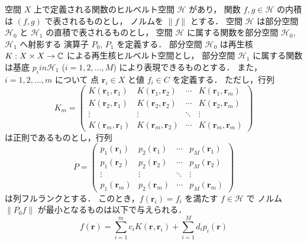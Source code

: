 \begin{theorem}\label{theorem:interp_kernel_rkhs_exact-interp-with-additional-terms}
    空間 $X$ 上で定義される関数のヒルベルト空間 $\mathcal{H}$ があり，
    関数 $f, g \in \mathcal{H}$ の内積は $(f, g)$ で表されるものとし，
    ノルムを $\|f\|$ とする．
    空間 $\mathcal{H}$ は部分空間 $\mathcal{H}_0$ と $\mathcal{H}_1$ の直積で表されるものとし，
    空間 $\mathcal{H}$ に属する関数を部分空間 $\mathcal{H}_0$, $\mathcal{H}_1$ へ射影する
    演算子 $P_0$, $P_1$ を定義する．
    部分空間 $\mathcal{H}_0$ は再生核 $K : X \times X \to \mathbb{C}$ による再生核ヒルベルト空間とし，
    部分空間 $\mathcal{H}_1$ に属する関数は基底 $p_i in \mathcal{H}_1$ ($i = 1, 2, \ldots, M$)
    により表現できるものとする．
    また，$i = 1, 2, \ldots, m$ について
    点 $\bm{r}_i \in X$ と値 $f_i \in C$ を定義する．
    ただし，行列
    \begin{equation}
        K_m =
        \begin{pmatrix}
            K(\bm{r}_1, \bm{r}_1) & K(\bm{r}_1, \bm{r}_2) & \cdots & K(\bm{r}_1, \bm{r}_m) \\
            K(\bm{r}_2, \bm{r}_1) & K(\bm{r}_2, \bm{r}_2) & \cdots & K(\bm{r}_2, \bm{r}_m) \\
            \vdots                & \vdots                & \ddots & \vdots                \\
            K(\bm{r}_m, \bm{r}_1) & K(\bm{r}_m, \bm{r}_2) & \cdots & K(\bm{r}_m, \bm{r}_m)
        \end{pmatrix}
    \end{equation}
    は正則であるものとし，行列
    \begin{equation}
        P =
        \begin{pmatrix}
            p_1(\bm{r}_1) & p_2(\bm{r}_1) & \cdots & p_M(\bm{r}_1) \\
            p_1(\bm{r}_2) & p_2(\bm{r}_2) & \cdots & p_M(\bm{r}_2) \\
            \vdots        & \vdots        & \ddots & \vdots        \\
            p_1(\bm{r}_m) & p_2(\bm{r}_m) & \cdots & p_M(\bm{r}_m)
        \end{pmatrix}
    \end{equation}
    は列フルランクとする．
    このとき，$f(\bm{r}_i) = f_i$ を満たす $f \in \mathcal{H}$ で
    ノルム $\|P_0 f\|$ が最小となるものは以下で与えられる．
    \begin{equation}
        f(\bm{r}) = \sum_{i = 1}^{m} c_i K(\bm{r}, \bm{r}_i) + \sum_{i=1}^M d_i p_i(\bm{r})

\end{equation}
\end{theorem}
